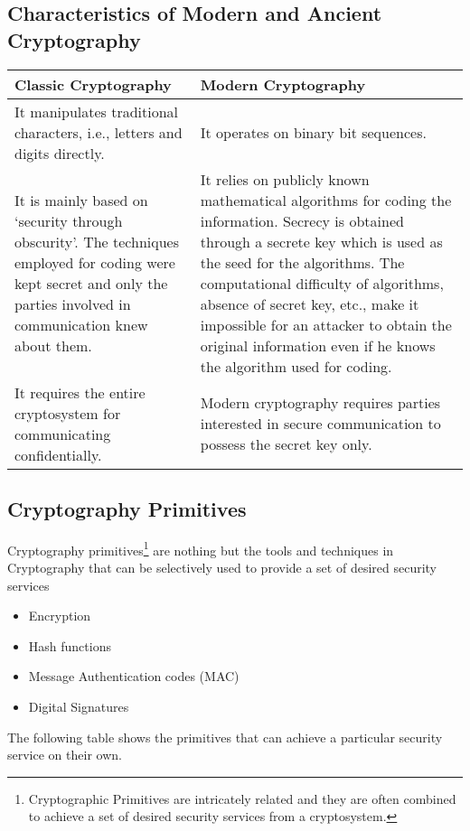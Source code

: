 \documentclass[british]{report}
\providecommand{\tabularnewline}{\\}
\begin{document}
\subsection{Characteristics of Modern and Ancient Cryptography}
\begin{center}
	\begin{tabular}{|m{0.38\paperwidth}|>{\raggedright}m{0.4\paperwidth}|}
		\hline
		\textbf{Classic Cryptography}                                             & \textbf{Modern Cryptography}\tabularnewline
		\hline
		\hline
		It manipulates traditional characters, i.e., letters and digits directly. & It operates on binary bit sequences.\tabularnewline
		\hline
		It is mainly based on `security through obscurity'. The techniques
		employed for coding were kept secret and only the parties involved
		in communication knew about them.                                         & It relies on publicly known mathematical algorithms for coding the
		information. Secrecy is obtained through a secrete key which is used
		as the seed for the algorithms. The computational difficulty of algorithms,
		absence of secret key, etc., make it impossible for an attacker to
		obtain the original information even if he knows the algorithm used
		for coding.\tabularnewline
		\hline
		It requires the entire cryptosystem for communicating confidentially.     & Modern cryptography requires parties interested in secure communication
		to possess the secret key only.\tabularnewline
		\hline
	\end{tabular}
	\par\end{center}

\subsection{Cryptography Primitives}

Cryptography primitives\footnote{Cryptographic Primitives are intricately related and they are often
	combined to achieve a set of desired security services from a cryptosystem.} are nothing but the tools and techniques in Cryptography that can
be selectively used to provide a set of desired security services
\textminus{}
\begin{itemize}
	\item Encryption
	\item Hash functions
	\item Message Authentication codes (MAC)
	\item Digital Signatures
\end{itemize}
The following table shows the primitives that can achieve a particular
security service on their own.
\end{document}
